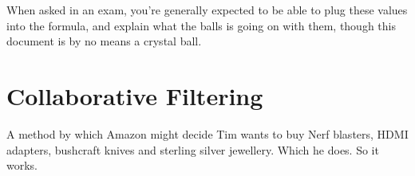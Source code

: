 \documentclass{article}
\begin{document}
    When asked in an exam, you're generally expected to be able to plug these values into the formula, and explain what the balls is going on with them, though this document is by no means a crystal ball.

    
    
    


\section{Collaborative Filtering}
    
    A method by which Amazon might decide Tim wants to buy Nerf blasters, HDMI adapters, bushcraft knives and sterling silver jewellery. Which he does. So it works.
    
\end{document}
